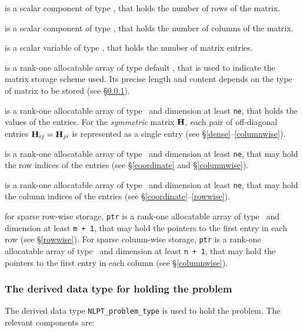 \documentclass{galahad}
\begin{document}
\begin{description}

 is a scalar component of type \integer, 
that holds the number of rows of the matrix.

 is a scalar component of type \integer, 
that holds the number of columns of the matrix. 
 
 is a scalar variable of type \integer, that
holds the number of matrix entries.

 is a rank-one allocatable array of type default \character, that
is used to indicate the matrix storage scheme used. Its precise length and
content depends on the type of matrix to be stored (see \S\ref{typeprob}).

 is a rank-one allocatable array of type \realdp\,
and dimension at least {\tt ne}, that holds the values of the entries.
For the {\em symmetric} matrix ${\mathbf{H}}$, each pair of off-diagonal entries
${\mathbf{H}}_{ij} = {\mathbf{H}}_{ji}$ is represented
as a single entry (see \S\ref{dense}--\ref{columnwise}).

 is a rank-one allocatable array of type \integer\ 
and dimension at least {\tt ne}, that may hold the row indices of the entries 
(see \S\ref{coordinate} and \S\ref{columnwise}).

 is a rank-one allocatable array of type \integer\ 
and dimension at least {\tt ne}, that may hold the column indices of the entries
(see \S\ref{coordinate}--\ref{rowwise}).

 for sparse row-wise storage, {\tt ptr} is a rank-one
allocatable array of type \integer\ and dimension at least
{\tt m + 1}, that may hold the pointers to the first entry in each row
(see \S\ref{rowwise}).  For sparse column-wise storage, {\tt ptr}
is a rank-one allocatable array of type \integer\ and
dimension at least {\tt n + 1}, that may hold the pointers to the
first entry in each column (see \S\ref{columnwise}).

\end{description}


\subsubsection{The derived data type for holding the problem}\label{typeprob}
The derived data type {\tt NLPT\_problem\_type} is used to hold the
problem. The relevant components are:
\end{document}
